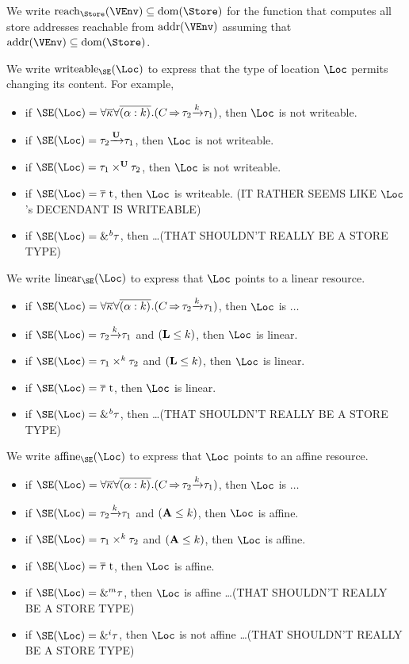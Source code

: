 We write $\Reach\Store\VEnv \subseteq \Dom\Store$ for the function
that computes all store addresses reachable from $\Addresses\VEnv$
assuming that $\Addresses\VEnv \subseteq \Dom\Store$. 

We write $\Writeable\SE\Loc$ to express that the type of location
$\Loc$ permits changing its content. For example,
\begin{itemize}
\item if $\SE (\Loc) =
  \forall\Multi\kvar\forall\Multi{\bvar{\alpha}{k}}.(\qual{C}{\tau_2\tarr{k}\tau_1})$,
  then $\Loc$ is not writeable.
\item if $\SE (\Loc) = \tau_2\tarr{\kun}{\tau_1}$, then $\Loc$ is not
  writeable.
\item if $\SE (\Loc) = \tyPair[\kun]{\tau_1}{\tau_2}$, then $\Loc$ is not writeable.
\item if $\SE (\Loc) = \tapp{t}{\Multi\tau}$, then $\Loc$ is
  writeable. (IT RATHER SEEMS LIKE $\Loc$'s DECENDANT IS WRITEABLE)
\item if $\SE (\Loc) = \borrow\tau$, then \dots (THAT SHOULDN'T REALLY
  BE A STORE TYPE)
\end{itemize}
We write $\Linear\SE\Loc$ to express that $\Loc$ points to a linear
resource.
\begin{itemize}
\item if $\SE (\Loc) =
  \forall\Multi\kvar\forall\Multi{\bvar{\alpha}{k}}.(\qual{C}{\tau_2\tarr{k}\tau_1})$,
  then $\Loc$ is $\dots$
\item if $\SE (\Loc) = \tau_2\tarr{k}{\tau_1}$ and $(\mathbf{L} \leq k)$, then $\Loc$ is linear.
\item if $\SE (\Loc) = \tyPair[k]{\tau_1}{\tau_2}$ and $(\mathbf{L} \leq k)$, then $\Loc$ is linear.
\item if $\SE (\Loc) = \tapp{t}{\Multi\tau}$, then $\Loc$ is linear.
\item if $\SE (\Loc) = \borrow\tau$, then \dots (THAT SHOULDN'T REALLY
  BE A STORE TYPE)
\end{itemize}
We write $\Affine\SE\Loc$ to express that $\Loc$ points to an affine
resource.
\begin{itemize}
\item if $\SE (\Loc) =
  \forall\Multi\kvar\forall\Multi{\bvar{\alpha}{k}}.(\qual{C}{\tau_2\tarr{k}\tau_1})$,
  then $\Loc$ is $\dots$
\item if $\SE (\Loc) = \tau_2\tarr{k}{\tau_1}$ and $(\mathbf{A} \leq k)$, then $\Loc$ is affine.
\item if $\SE (\Loc) = \tyPair[k]{\tau_1}{\tau_2}$ and $(\mathbf{A} \leq k)$, then $\Loc$ is affine.
\item if $\SE (\Loc) = \tapp{t}{\Multi\tau}$, then $\Loc$ is affine.
\item if $\SE (\Loc) = \borrow[\MBORROW]\tau$, then $\Loc$ is affine
  \dots (THAT SHOULDN'T REALLY  BE A STORE TYPE)
\item if $\SE (\Loc) = \borrow[\IBORROW]\tau$, then $\Loc$ is not affine
  \dots (THAT SHOULDN'T REALLY  BE A STORE TYPE)
\end{itemize}
